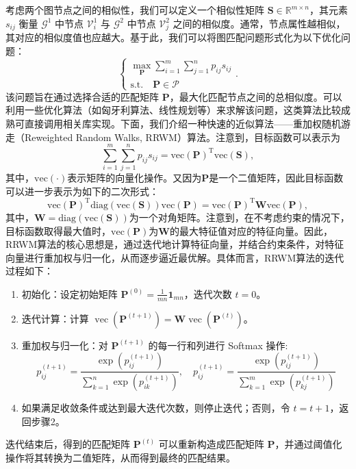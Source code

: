 考虑两个图节点之间的相似性，我们可以定义一个相似性矩阵 $\mathbf{S} \in \mathbb R^{m \times n}$，其元素 $s_{ij}$ 衡量 $\mathcal G^1$ 中节点 $\mathcal V^1_i$ 与 $\mathcal G^2$ 中节点 $\mathcal V^2_j$ 之间的相似度。通常，节点属性越相似，其对应的相似度值也应越大。基于此，我们可以将图匹配问题形式化为以下优化问题：
\[
    \begin{cases}
        \max_{\mathbf{P}} \sum_{i=1}^{m} \sum_{j=1}^{n} p_{ij} s_{ij} \\
        \text{s.t.} \quad \mathbf{P} \in \mathcal{P}
    \end{cases}.
\]
该问题旨在通过选择合适的匹配矩阵 $\mathbf{P}$，最大化匹配节点之间的总相似度。可以利用一些优化算法（如匈牙利算法、线性规划等）来求解该问题，这类算法比较成熟可直接调用相关库实现。下面，我们介绍一种快速的近似算法——重加权随机游走（Reweighted Random Walks, RRWM）算法。注意到，目标函数可以表示为
\[
    \sum_{i=1}^{m} \sum_{j=1}^{n} p_{ij} s_{ij} = \mathrm{vec}(\mathbf{P})^{\mathrm{T}} \mathrm{vec}(\mathbf{S}),
\]
其中，\( \mathrm{vec}(\cdot) \)表示矩阵的向量化操作。又因为\( \mathbf{P} \)是一个二值矩阵，因此目标函数可以进一步表示为如下的二次形式：
\[
    \mathrm{vec}(\mathbf{P})^{\mathrm{T}} \mathrm{diag}(\mathrm{vec}(\mathbf{S})) \mathrm{vec}(\mathbf{P}) = \mathrm{vec}(\mathbf{P})^{\mathrm{T}} \mathbf{W} \mathrm{vec}(\mathbf{P}),
\]
其中，\( \mathbf{W} = \mathrm{diag}(\mathrm{vec}(\mathbf{S})) \)为一个对角矩阵。注意到，在不考虑约束的情况下，目标函数取得最大值时，\( \mathrm{vec}(\mathbf{P}) \)为\( \mathbf{W} \)的最大特征值对应的特征向量。因此，RRWM算法的核心思想是，通过迭代地计算特征向量，并结合约束条件，对特征向量进行重加权与归一化，从而逐步逼近最优解。具体而言，RRWM算法的迭代过程如下：
\begin{enumerate}
    \item 初始化：设定初始矩阵 $\mathbf{P}^{(0)} = \frac{1}{mn} \mathbf{1}_{mn}$，迭代次数 $t=0$。
    \item 迭代计算：计算 $\operatorname{vec}(\mathbf{P}^{(t+1)}) = \mathbf{W} \operatorname{vec}(\mathbf{P}^{(t)})$。
    \item 重加权与归一化：对 $\mathbf{P}^{(t+1)}$ 的每一行和列进行 Softmax 操作:
          \[
              p_{ij}^{(t+1)} = \frac{\exp(p_{ij}^{(t+1)})}{\sum_{k=1}^{n} \exp(p_{ik}^{(t+1)})}, \quad p_{ij}^{(t+1)} = \frac{\exp(p_{ij}^{(t+1)})}{\sum_{k=1}^{m} \exp(p_{kj}^{(t+1)})}
          \]
    \item 如果满足收敛条件或达到最大迭代次数，则停止迭代；否则，令 $t = t + 1$，返回步骤2。
\end{enumerate}
迭代结束后，得到的匹配矩阵 $\mathbf{P}^{(t)}$ 可以重新构造成匹配矩阵 $\mathbf{P}$，并通过阈值化操作将其转换为二值矩阵，从而得到最终的匹配结果。

